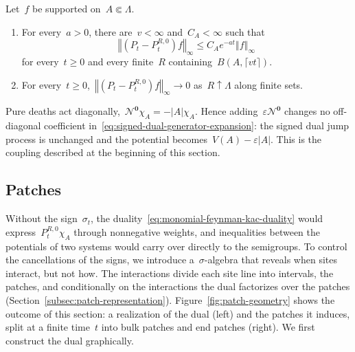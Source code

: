 \documentclass[EJP,preprint,NODS,nobera]{ejpecp}
\newcommand{\bb}[1]{\left(#1\right)}
\newcommand{\norm}[1]{\left\Vert#1\right\Vert}
\newcommand{\abs}[1]{\left|#1\right|}
\newcommand{\mb}[1]{\mathbf{#1}}
\newcommand{\Ncal}{\mathcal{N}}
\newcommand{\chg}[1]{{\color{changegreen}#1}}
\begin{document}
\begin{lemma}
\label{lem:finite-propagation}
Let~$f$ be supported on~$A\Subset\Lambda$.
\begin{enumerate}[label=\textup{(\alph*)}]
\item For every~$a>0$, there are~$v<\infty$ and~$C_A<\infty$ such that
\begin{equation}
\label{eq:finite-propagation}
\norm{\bb{P_t-P_t^{R,0}}f}_\infty
\leq
C_Ae^{-at}\norm f_\infty
\end{equation}
for every~$t\geq0$ and every finite~$R$ containing~$B\bb{A,\lceil vt\rceil}$.
\item \chg{For every~$t\geq0$,~$\norm{\bb{P_t-P_t^{R,0}}f}_\infty\to0$
as~$R\uparrow\Lambda$ along finite sets.}
\end{enumerate}
\end{lemma}

\chg{\begin{remark}
\label{rem:pure-deaths-diagonal}
Pure deaths act diagonally,~$\Ncal^{\mb 0}\chi_A=-\abs{A}\chi_A$. Hence
adding~$\varepsilon\Ncal^{\mb 0}$ changes no off-diagonal coefficient
in~\eqref{eq:signed-dual-generator-expansion}: the signed dual jump process is
unchanged and the potential becomes~$V(A)-\varepsilon\abs{A}$. This is the
coupling described at the beginning of this section.
\end{remark}}


\subsection{Patches}
\label{sec:patches}

\chg{Without the sign~$\sigma_t$, the duality~\eqref{eq:monomial-feynman-kac-duality}
would express~\chg{$P_t^{R,0}\chi_A$} through nonnegative weights, and inequalities
between the potentials of two systems would carry over directly to the
semigroups. To control the cancellations of the signs, we introduce
a~$\sigma$-algebra that reveals when sites interact, but not how. The
interactions divide each site line into intervals, the patches, and
conditionally on the interactions the dual factorizes over the patches
(Section~\ref{subsec:patch-representation}).
Figure~\ref{fig:patch-geometry} shows the outcome of this section: a
realization of the dual (left) and the patches it induces, split at a finite
time~$t$ into bulk patches and end patches (right). We first construct the dual
graphically.}
\end{document}
